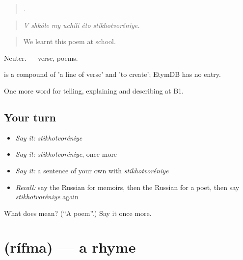 \begin{quote}
     .
\end{quote}

\begin{quote}
\emph{V shkóle my uchíli éto stikhotvoréniye.}
\end{quote}

\begin{quote}
We learnt this poem at school.
\end{quote}

Neuter. \emph{} — verse, poems.

\begin{cousinweb}
\emph{} is a compound of \emph{} 'a line of verse' and \emph{} 'to create'; EtymDB has no entry.
\end{cousinweb}

\begin{grammarlens}[title={What you've built}]
One more word for telling, explaining and describing at B1.
\end{grammarlens}

\subsection*{Your turn}
\begin{itemize}
\raggedright
  \item \emph{Say it:} \emph{stikhotvoréniye}
  \item \emph{Say it:} \emph{stikhotvoréniye}, once more
  \item \emph{Say it:} a sentence of your own with \emph{stikhotvoréniye}
  \item \emph{Recall:} say the Russian for memoirs, then the Russian for a poet, then say \emph{stikhotvoréniye} again
\end{itemize}

\begin{tcolorbox}[breakable,colback=teal!4,colframe=teal!35!black,title={Before you move on}]
What does  mean? (\textquotedblleft{}A poem\textquotedblright{}.) Say it once more.
\end{tcolorbox}
\section[\texorpdfstring{\ru{рифма} (rífma)}{рифма (rífma)}]{ (rífma) — a rhyme}

\label{lesson:RU-C525-rifma}



